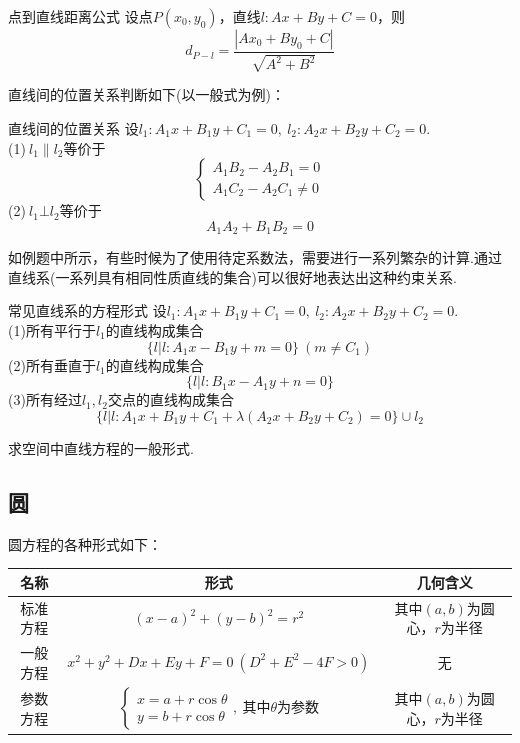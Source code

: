 \documentclass[lang=cn, zihao=5]{elegantbook}
\begin{document}
\begin{theorem}{点到直线距离公式}
	设点$P(x_0,y_0)$，直线$l:Ax+By+C=0$，则$$d_{P-l}=\frac{|Ax_0+By_0+C|}{\sqrt{A^2+B^2}}$$
\end{theorem}

直线间的位置关系判断如下(以一般式为例)：

\begin{proposition}{直线间的位置关系}
	设$l_1:A_1x+B_1y+C_1=0,~l_2:A_2x+B_2y+C_2=0$. \\
	(1)$~l_1 \parallel l_2$等价于$$\begin{cases}
		A_1B_2-A_2B_1=0 \\
		A_1C_2-A_2C_1 \neq 0
	\end{cases}$$
	(2)$~l_1 \bot l_2$等价于$$A_1A_2+B_1B_2=0$$
\end{proposition}

如例题中所示，有些时候为了使用待定系数法，需要进行一系列繁杂的计算.通过直线系(一系列具有相同性质直线的集合)可以很好地表达出这种约束关系.

\begin{proposition}{常见直线系的方程形式}
	设$l_1:A_1x+B_1y+C_1=0,~l_2:A_2x+B_2y+C_2=0$. \\
	(1)所有平行于$l_1$的直线构成集合$$\{ l|l:A_1x-B_1y+m=0 \}~(m \neq C_1)$$
	(2)所有垂直于$l_1$的直线构成集合$$\{ l|l:B_1x-A_1y+n=0 \}$$
	(3)所有经过$l_1,l_2$交点的直线构成集合$$\{ l|l:A_1x+B_1y+C_1+\lambda (A_2x+B_2y+C_2)=0 \} \cup l_2$$
\end{proposition}

\begin{problem}
	求空间中直线方程的一般形式.
\end{problem}

\subsection{圆}

圆方程的各种形式如下：

\begin{table}[h]
	\centering
	\renewcommand\arraystretch{1.5}
	\begin{tabular}{ccc}
		\toprule
		名称&形式&几何含义 \\
		\midrule
		标准方程 & $(x-a)^2+(y-b)^2=r^2$ & 其中$(a,b)$为圆心，$r$为半径 \\
		一般方程 & $x^2+y^2+Dx+Ey+F=0~(D^2+E^2-4F>0)$ & 无 \\
		参数方程 & $\begin{cases}
			x=a+r\cos \theta \\
			y=b+r\cos \theta
		\end{cases}, ~\textit{其中}\theta \textit{为参数}$ & 其中$(a,b)$为圆心，$r$为半径 \\
		\bottomrule
	\end{tabular}
\end{table}
\end{document}
